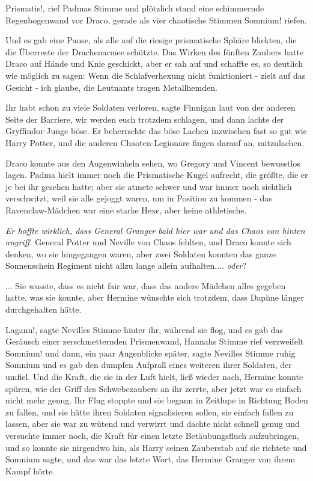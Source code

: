 \glqq{}Prismatis!\grqq{}, rief Padmas Stimme und plötzlich stand eine schimmernde
Regenbogenwand vor Draco, gerade als vier chaotische Stimmen \glqq{}
Somnium!\grqq{} riefen.

Und es gab eine Pause, als alle auf die riesige prismatische Sphäre blickten,
die die Überreste der Drachenarmee schützte. Das Wirken des fünften Zaubers
hatte Draco auf Hände und Knie geschickt, aber er sah auf und schaffte es, so
deutlich wie möglich zu sagen: \glqq{}Wenn die Schlafverhexung nicht funktioniert
- zielt auf das Gesicht - ich glaube, die Leutnants tragen Metallhemden.\grqq{}

\glqq{}Ihr habt schon zu viele Soldaten verloren\grqq{}, sagte Finnigan laut von
der anderen Seite der Barriere, \glqq{}wir werden euch trotzdem schlagen\grqq{},
und dann lachte der Gryffindor-Junge böse. Er beherrschte das böse Lachen
inzwischen fast so gut wie Harry Potter, und die anderen Chaoten-Legionäre
fingen darauf an, mitzulachen.

Draco konnte aus den Augenwinkeln sehen, wo Gregory und Vincent bewusstlos
lagen. Padma hielt immer noch die Prismatische Kugel aufrecht, die größte, die
er je bei ihr gesehen hatte; aber sie atmete schwer und war immer noch sichtlich
verschwitzt, weil sie alle gejoggt waren, um in Position zu kommen - das
Ravenclaw-Mädchen war eine starke Hexe, aber keine athletische.

\emph{Er hoffte wirklich, dass General Granger bald hier war und das Chaos von
hinten angriff.} General Potter und Neville von Chaos fehlten, und Draco konnte
sich denken, wo sie hingegangen waren, aber zwei Soldaten konnten das ganze
Sonnenschein Regiment nicht allzu lange allein aufhalten.... \emph{oder}?

... Sie wusste, dass es nicht fair war, dass das andere Mädchen alles gegeben
hatte, was sie konnte, aber Hermine wünschte sich trotzdem, dass Daphne länger
durchgehalten hätte.

\glqq{}Lagann!\grqq{}, sagte Nevilles Stimme hinter ihr, während sie flog, und es
gab das Geräusch einer zerschmetternden Prismenwand, Hannahs Stimme rief
verzweifelt \glqq{}Somnium!\grqq{} und dann, ein paar Augenblicke später, sagte
Nevilles Stimme ruhig \glqq{}Somnium\grqq{} und es gab den dumpfen Aufprall eines
weiteren ihrer Soldaten, der umfiel. Und die Kraft, die sie in der Luft hielt,
ließ wieder nach, Hermine konnte spüren, wie der Griff des Schwebezaubers an ihr
zerrte, aber jetzt war es einfach nicht mehr genug. Ihr Flug stoppte und sie
begann in Zeitlupe in Richtung Boden zu fallen, und sie hätte ihren Soldaten
signalisieren sollen, sie einfach fallen zu lassen, aber sie war zu wütend und
verwirrt und dachte nicht schnell genug und versuchte immer noch, die Kraft für
einen letzte Betäubungsfluch aufzubringen, und so konnte sie nirgendwo hin, als
Harry seinen Zauberstab auf sie richtete und \glqq{}Somnium\grqq{} sagte, und das
war das letzte Wort, das Hermine Granger von ihrem Kampf hörte.


